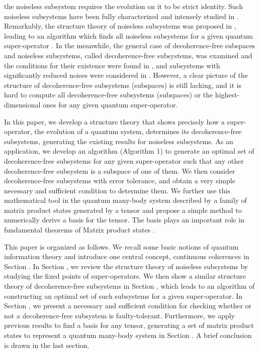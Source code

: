 \documentclass[journal]{IEEEtran}
\begin{document}
the noiseless subsystem requires the evolution on it to be strict identity. Such noiseless subsystems have been fully characterized and intensely studied in \cite{choi2006method,blume2010information,beny2007generalization,kribs2006quantum,kribs2005unified}. Remarkably, the structure theory of noiseless subsystems  was proposed in \cite{choi2006method}, leading to an algorithm which finds all noiseless subsystems for a given quantum super-operator \cite{knill2006protected,wang2013numerical}. In the meanwhile, the general case of decoherence-free subspaces and noiseless subsystems, called decoherence-free subsystems, was examined and the conditions for their existence were found in \cite{shabani2005theory}, and subsystems with significantly reduced noises  were considered in \cite{wang2016minimal}. However, a clear picture of the structure of  decoherence-free subsystems (subspaces) is still lacking, and it is hard to compute all decoherence-free subsystems (subspaces) or the highest-dimensional ones for any given quantum super-operator. 

In this paper,  we develop a structure theory that shows precisely how a super-operator, the evolution of a quantum system, determines its decoherence-free subsystems, generating the existing results for noiseless subsystems. As an application, we develop an algorithm (Algorithm 1) to generate an optimal set of decoherence-free subsystems for any given super-operator such that any other decoherence-free subsystem is a subspace of one of them. We then consider decoherence-free subsystems with error tolerance, and obtain a very simple necessary and sufficient condition to determine them. 
We further use this mathematical tool in the quantum many-body system described by a family of matrix product states generated by a tensor and propose a  simple method to numerically derive   a basis for the tensor. The basis plays an important role in fundamental theorems of Matrix product states \cite{cirac2017matrix,cuevas2017irreducible}.

This paper is organized as follows. We recall some basic notions of quantum information theory and introduce one central concept, continuous coherences in Section \uppercase\expandafter{}. In Section \uppercase\expandafter{}, we review the structure theory of noiseless subsystems by studying the fixed points of super-operators. We then show a similar structure theory of decoherence-free subsystems in Section \uppercase\expandafter{}, which leads to an algorithm of constructing an optimal set of  such subsystems for a given super-operator. In Section \uppercase\expandafter{}, we present a necessary and sufficient condition for checking whether or not a decoherence-free subsystem is faulty-tolerant. Furthermore, 
we apply previous results to find a basis for any tensor, generating a set of matrix product states to represent a quantum many-body system  in Section \uppercase\expandafter{}. A brief conclusion is drawn in the last section.
\end{document}
